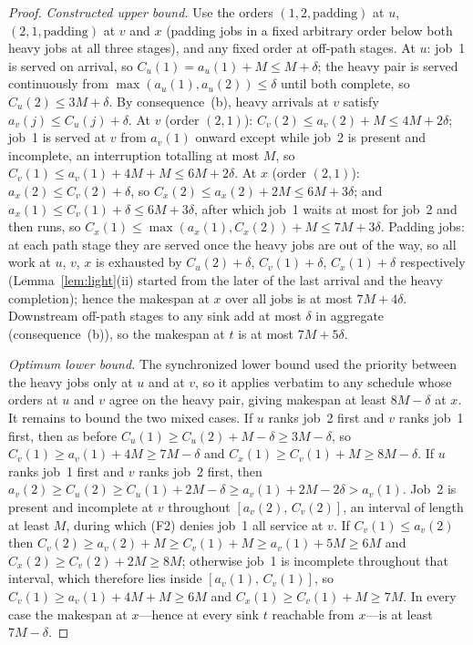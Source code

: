 \documentclass[sn-mathphys,NameDate]{sn-jnl}
\theoremstyle{thmstyleone}
\theoremstyle{thmstylethree}
\theoremstyle{thmstyletwo}
\begin{document}
\begin{proof}
\emph{Constructed upper bound.} Use the orders
$(1, 2, \text{padding})$ at $u$, $(2, 1, \text{padding})$ at
$v$ and $x$ (padding jobs in a fixed arbitrary order below
both heavy jobs at all three stages), and any fixed order at
off-path stages. At $u$: job~1 is served on arrival, so
$C_u(1) = a_u(1) + M \leq M + \delta$; the heavy pair is
served continuously from
$\max(a_u(1), a_u(2)) \leq \delta$ until both complete, so
$C_u(2) \leq 3M + \delta$. By consequence~(b), heavy
arrivals at $v$ satisfy $a_v(j) \leq C_u(j) + \delta$. At $v$
(order $(2,1)$): $C_v(2) \leq a_v(2) + M
\leq 4M + 2\delta$; job~1 is served at $v$ from $a_v(1)$
onward except while job~2 is present and incomplete, an
interruption totalling at most $M$, so
$C_v(1) \leq a_v(1) + 4M + M \leq 6M + 2\delta$. At $x$
(order $(2,1)$): $a_x(2) \leq C_v(2) + \delta$, so
$C_x(2) \leq a_x(2) + 2M \leq 6M + 3\delta$; and
$a_x(1) \leq C_v(1) + \delta \leq 6M + 3\delta$, after which
job~1 waits at most for job~2 and then runs, so
$C_x(1) \leq \max(a_x(1), C_x(2)) + M \leq 7M + 3\delta$.
Padding jobs: at each path stage they are served once the
heavy jobs are out of the way, so all work at $u$, $v$, $x$ is
exhausted by $C_u(2) + \delta$, $C_v(1) + \delta$,
$C_x(1) + \delta$ respectively (Lemma~\ref{lem:light}(ii)
started from the later of the last arrival and the heavy
completion); hence the makespan at $x$ over all jobs is at
most $7M + 4\delta$. Downstream off-path stages to any sink
add at most $\delta$ in aggregate (consequence~(b)), so the
makespan at $t$ is at most $7M + 5\delta$.

\emph{Optimum lower bound.} The synchronized lower bound used
the priority between the heavy jobs only at $u$ and at $v$, so
it applies verbatim to any schedule whose orders at $u$ and $v$
agree on the heavy pair, giving makespan at least
$8M - \delta$ at $x$. It remains to bound the two mixed cases.
If $u$ ranks job~2 first and $v$ ranks job~1 first, then as
before $C_u(1) \geq C_u(2) + M - \delta \geq 3M - \delta$, so
$C_v(1) \geq a_v(1) + 4M \geq 7M - \delta$ and
$C_x(1) \geq C_v(1) + M \geq 8M - \delta$. If $u$ ranks job~1
first and $v$ ranks job~2 first, then
$a_v(2) \geq C_u(2) \geq C_u(1) + 2M - \delta
\geq a_v(1) + 2M - 2\delta > a_v(1)$. Job~2 is present and
incomplete at $v$ throughout $[a_v(2),\, C_v(2)]$, an interval
of length at least $M$, during which (F2) denies job~1 all
service at $v$. If $C_v(1) \leq a_v(2)$ then
$C_v(2) \geq a_v(2) + M \geq C_v(1) + M
\geq a_v(1) + 5M \geq 6M$ and
$C_x(2) \geq C_v(2) + 2M \geq 8M$; otherwise job~1 is
incomplete throughout that interval, which therefore lies
inside $[a_v(1),\, C_v(1)]$, so
$C_v(1) \geq a_v(1) + 4M + M \geq 6M$ and
$C_x(1) \geq C_v(1) + M \geq 7M$. In every case the makespan
at $x$---hence at every sink $t$ reachable from $x$---is at
least $7M - \delta$.


\end{proof}
\end{document}
